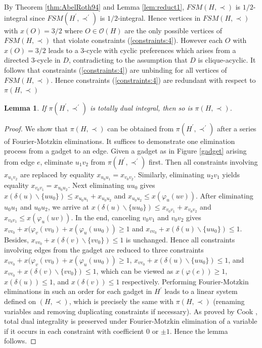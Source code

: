 \documentclass[11pt]{article}
\newtheorem{lemma}[theorem]{Lemma}
\numberwithin{theorem}{section}
\begin{document}
By Theorem \ref{thm:AbelRoth94} and Lemma \ref{lem:reduct1}, $FSM(H,\prec)$ is $1/2$-integral since $FSM(H^\prime,\prec^\prime)$ is $1/2$-integral.
Hence vertices in $FSM(H,\prec)$ with $x(O)=3/2$ where $O\in \mathcal{O}(H)$ are the only possible vertices of $FSM(H,\prec)$ that violate constraints (\ref{constraints:4}).
However each $O$ with $x(O)=3/2$ leads to a $3$-cycle with cyclic preferences which arises from a directed $3$-cycle in $D$, contradicting to the assumption that $D$ is clique-acyclic.
It follows that constraints (\ref{constraints:4}) are unbinding for all vertices of $FSM(H,\prec)$.
Hence constraints (\ref{constraints:4}) are redundant with respect to $\pi(H,\prec)$

\begin{lemma}
\label{lem:reduct2}
  If $\pi(H^\prime,\prec^\prime)$ is  totally dual integral, then so is $\pi(H,\prec)$.
\end{lemma}
\begin{proof}
  We show that $\pi(H,\prec)$ can be obtained from $\pi(H^\prime,\prec^\prime)$ after a series of Fourier-Motzkin eliminations.
  It suffices to demonstrate one elimination process from a gadget to an edge.
  Given a gadget as in Figure \ref{gadget} arising from edge $e$, eliminate $u_1 v_2$ from $\pi(H^\prime,\prec^\prime)$ first.
  Then all constraints involving $x_{u_1 v_2}$ are replaced by equality $x_{u_0 u_1}=x_{v_0 v_2}$.
  Similarly, eliminating $u_2 v_1$ yields equality $x_{v_0 v_1}=x_{u_0 u_2}$.
  Next eliminating $u u_0$ gives $x(\delta (u)\backslash\{u u_0\})\leq x_{u_0 u_1}+x_{u_0 u_2}$ and $x_{u_0 u_2}\leq x(\varphi_u(uv))$.
  After eliminating $u_0 u_1$ and $u_0 u_2$, we arrive at $x(\delta(u)\backslash\{u u_0\})\leq x_{v_0 v_1}+x_{v_0 v_2}$ and $x_{v_0 v_1}\leq x(\varphi_u(uv))$.
  In the end, canceling $v_0 v_1$ and $v_0 v_2$ gives $x_{v v_0}+x(\varphi_v(v v_0)+x(\varphi_u(u u_0))\geq 1$ and $x_{v v_0}+x(\delta(u)\backslash\{u u_0\})\leq 1$.
  Besides, $x_{v v_0}+x(\delta(v)\backslash\{v v_0\})\leq 1$ is unchanged.
  Hence all constraints involving edges from the gadget are reduced to three constraints
  $x_{v v_0}+x(\varphi_v(v v_0)+x(\varphi_u(u u_0))\geq 1$,
  $x_{v v_0}+x(\delta (u)\backslash\{u u_0\})\leq 1$,
  and $x_{v v_0}+x(\delta(v)\backslash\{v v_0\})\leq 1$,
  which can be viewed as $x(\varphi(e))\geq 1$, $x(\delta(u))\leq 1$, and $x(\delta(v))\leq 1$ respectively.
  Performing Fourier-Motzkin eliminations in such an order for each gadget in $H^\prime$ leads to a linear system defined on $(H,\prec)$, which is precisely the same with $\pi(H,\prec)$ (renaming variables and removing duplicating constraints if necessary).
  As proved by Cook \cite{Cook83}, total dual integrality is preserved under Fourier-Motzkin elimination of a variable if it occurs in each constraint with coefficient $0$ or $\pm 1$.
  Hence the lemma follows.
\end{proof}
\end{document}
